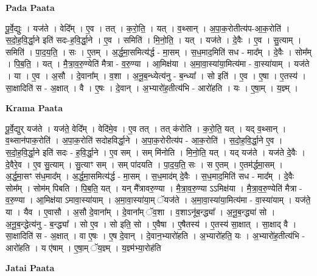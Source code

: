 \documentclass[17pt]{extarticle}
\begin{document}
\textbf{Pada Paata} \newline

पू॒र्वे॒द्युः । यज॑ते । वेदि᳚म् । ए॒व । तत् । क॒रो॒ति॒ । यत् । व॒थ्सान् । अ॒पा॒क॒रोतीत्य॑प-आ॒क॒रोति॑ । स॒दो॒ह॒वि॒र्द्धा॒ने इति॑ सदः-ह॒वि॒र्द्धा॒ने । ए॒व । समिति॑ । मि॒नो॒ति॒ । यत् । यज॑ते । दे॒वैः । ए॒व । सु॒त्याम् । समिति॑ । पा॒द॒य॒ति॒ । सः । ए॒तम् । अ॒र्द्ध॒मा॒समित्य॑र्द्ध - मा॒सम् । स॒ध॒माद॒मिति॑ सध - माद᳚म् । दे॒वैः । सोम᳚म् । पि॒ब॒ति॒ । यत् । मै॒त्रा॒व॒रु॒ण्येति॑ मैत्रा - व॒रु॒ण्या । आ॒मिक्ष॑या । अ॒मा॒वा॒स्या॑या॒मित्य॑मा - वा॒स्या॑याम् । यज॑ते । या । ए॒व । अ॒सौ । दे॒वाना᳚म् । व॒शा । अ॒नू॒ब॒न्ध्येत्य॑नु - ब॒न्ध्या᳚ । सो इति॑ । ए॒व । ए॒षा । ए॒तस्य॑ । सा॒क्षादिति॑ स - अ॒क्षात् । वै । ए॒षः । दे॒वान् । अ॒भ्यारो॑ह॒तीत्य॑भि - आरो॑हति । यः । ए॒षा॒म् । य॒ज्ञ्म् ।  \newline


\textbf{Krama Paata} \newline

पू॒र्वे॒द्युर् यज॑ते । यज॑ते॒ वेदि᳚म् । वेदि॑मे॒व । ए॒व तत् । तत् क॑रोति । क॒रो॒ति॒ यत् । यद् व॒थ्सान् । व॒थ्सान॑पाक॒रोति॑ । अ॒पा॒क॒रोति॑ सदोहविर्द्धा॒ने । अ॒पा॒क॒रोरीत्य॑प - आ॒क॒रोति॑ । स॒दो॒ह॒वि॒र्द्धा॒ने ए॒व । स॒दो॒ह॒वि॒र्द्धा॒ने इति॑ सदः - ह॒वि॒र्द्धा॒ने । ए॒व सम् । सम् मि॑नोति । मि॒नो॒ति॒ यत् । यद् यज॑ते । यज॑ते दे॒वैः । दे॒वैरे॒व । ए॒व सु॒त्याम् । सु॒त्याꣳ सम् । सम् पा॑दयति । पा॒द॒य॒ति॒ सः । स ए॒तम् । ए॒तम॑र्द्धमा॒सम् । अ॒र्द्ध॒मा॒सꣳ स॑ध॒माद᳚म् । अ॒र्द्ध॒मा॒समित्य॑र्द्ध - मा॒सम् । स॒ध॒माद॑म् दे॒वैः । स॒ध॒माद॒मिति॑ सध - माद᳚म् । दे॒वैः सोम᳚म् । सोम॑म् पिबति । पि॒ब॒ति॒ यत् । यन् मै᳚त्रावरु॒ण्या । मै॒त्रा॒व॒रु॒ण्या ऽऽमिक्ष॑या । मै॒त्रा॒व॒रु॒ण्येति॑ मैत्रा - व॒रु॒ण्या । आ॒मिक्ष॑या ऽमावा॒स्या॑याम् । अ॒मा॒वा॒स्या॑या॒म् ॅयज॑ते । अ॒मा॒वा॒स्या॑या॒मित्य॑मा - वा॒स्या॑याम् । यज॑ते॒ या । यैव । ए॒वासौ । अ॒सौ दे॒वाना᳚म् । दे॒वाना᳚म् ॅव॒शा । व॒शाऽनू॑ब॒न्द्ध्या᳚ । अ॒नू॒ब॒न्द्ध्या॑ सो । अ॒नू॒ब॒न्द्धेत्य॑नु - ब॒न्द्ध्या᳚ । सो ए॒व । सो इति॒ सो । ए॒वैषा । ए॒षैतस्य॑ । ए॒तस्य॑ सा॒क्षात् । सा॒क्षाद् वै । सा॒क्षादिति॑ स - अ॒क्षात् । वा ए॒षः । ए॒ष दे॒वान् । दे॒वान॒भ्यारो॑हति । अ॒भ्यारो॑हति॒ यः । अ॒भ्यारो॑ह॒तीत्य॑भि - आरो॑हति । य ए॑षाम् । ए॒षा॒म् ॅय॒ज्ञ्म् । य॒ज्ञ्म॑भ्या॒रोह॑ति \newline

\textbf{Jatai Paata} \newline
\end{document}

